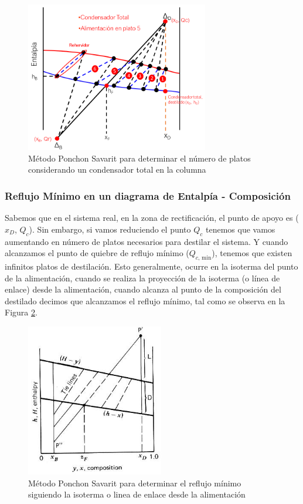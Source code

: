 \documentclass[11pt]{book}
\begin{document}
\begin{figure}
    \centering
    \includegraphics[width=8cm]{img/destilacion/PonchonSavaritNroPlatos.png}
    \caption{Método Ponchon Savarit para determinar el número de platos considerando un condensador total en la columna}
    \label{fig:MetodoPonchonNroPlatos}
\end{figure}

\newpage

\subsubsection{Reflujo Mínimo en un diagrama de Entalpía - Composición}

Sabemos que en el sistema real, en la zona de rectificación, el punto de apoyo es ($x_D$, $Q_c$). Sin embargo, si vamos reduciendo el punto $Q_c$ tenemos que vamos aumentando en número de platos necesarios para destilar el sistema. Y cuando alcanzamos el punto de quiebre de reflujo mínimo ($Q_{c \textrm{, min}}$), tenemos que existen infinitos platos de destilación. Esto generalmente, ocurre en la isoterma del punto de la alimentación, cuando se realiza la proyección de la isoterma (o línea de enlace) desde la alimentación, cuando alcanza al punto de la composición del destilado decimos que alcanzamos el reflujo mínimo, tal como se observa en la Figura \ref{fig:PonchonSavaritReflujoMinimo}. 

\begin{figure}[H]
    \centering
    \includegraphics[width=6cm]{img/destilacion/PonchonSavaritReflujoMinimo.png}
    \caption{Método Ponchon Savarit para determinar el reflujo mínimo siguiendo la isoterma o linea de enlace desde la alimentación}
    \label{fig:PonchonSavaritReflujoMinimo}
\end{figure}
\end{document}
